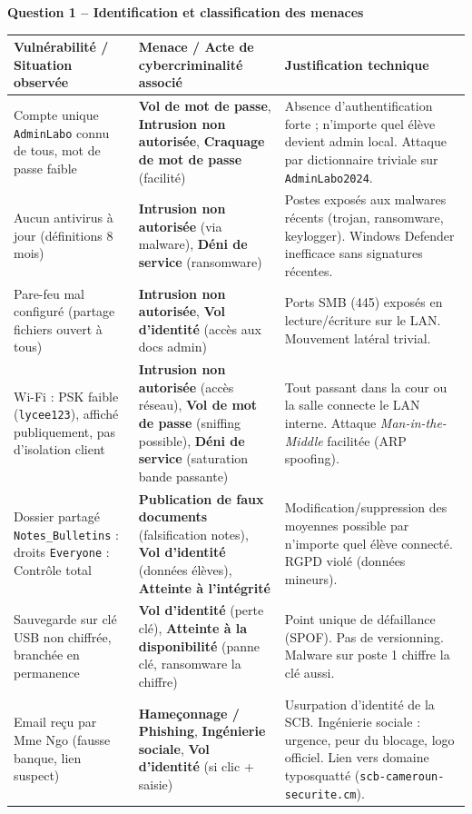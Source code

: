 \documentclass[11pt]{article}
\newcounter{popsec}
\newcounter{popsub}
\newcommand{\courssub}[1]{%
  \stepcounter{popsub}%
  \par\vspace{9pt}\noindent{\popxbold\fontsize{11.5}{13}\selectfont\color{popink}{\color{poporange}\thepopsec.\thepopsub}\hspace{6pt}#1}\par\nopagebreak\vspace{4pt}
}
\begin{document}
\courssub{Démarche et corrigé commenté}
\begin{exoresolu}
\textbf{Question 1 -- Identification et classification des menaces}

\begin{center}
\begin{tabularx}{\linewidth}{|l|X|X|}
\hline
\rowcolor{popblueL}
\textbf{Vulnérabilité / Situation observée} & \textbf{Menace / Acte de cybercriminalité associé} & \textbf{Justification technique} \\
\hline
Compte unique \texttt{AdminLabo} connu de tous, mot de passe faible & \textbf{Vol de mot de passe}, \textbf{Intrusion non autorisée}, \textbf{Craquage de mot de passe} (facilité) & Absence d'authentification forte ; n'importe quel élève devient admin local. Attaque par dictionnaire triviale sur \texttt{AdminLabo2024}. \\
\hline
Aucun antivirus à jour (définitions 8 mois) & \textbf{Intrusion non autorisée} (via malware), \textbf{Déni de service} (ransomware) & Postes exposés aux malwares récents (trojan, ransomware, keylogger). Windows Defender inefficace sans signatures récentes. \\
\hline
Pare-feu mal configuré (partage fichiers ouvert à tous) & \textbf{Intrusion non autorisée}, \textbf{Vol d'identité} (accès aux docs admin) & Ports SMB (445) exposés en lecture/écriture sur le LAN. Mouvement latéral trivial. \\
\hline
Wi-Fi : PSK faible (\texttt{lycee123}), affiché publiquement, pas d'isolation client & \textbf{Intrusion non autorisée} (accès réseau), \textbf{Vol de mot de passe} (sniffing possible), \textbf{Déni de service} (saturation bande passante) & Tout passant dans la cour ou la salle connecte le LAN interne. Attaque \emph{Man-in-the-Middle} facilitée (ARP spoofing). \\
\hline
Dossier partagé \texttt{Notes\_Bulletins} : droits \texttt{Everyone} : Contrôle total & \textbf{Publication de faux documents} (falsification notes), \textbf{Vol d'identité} (données élèves), \textbf{Atteinte à l'intégrité} & Modification/suppression des moyennes possible par n'importe quel élève connecté. RGPD violé (données mineurs). \\
\hline
Sauvegarde sur clé USB non chiffrée, branchée en permanence & \textbf{Vol d'identité} (perte clé), \textbf{Atteinte à la disponibilité} (panne clé, ransomware la chiffre) & Point unique de défaillance (SPOF). Pas de versionning. Malware sur poste 1 chiffre la clé aussi. \\
\hline
Email reçu par Mme Ngo (fausse banque, lien suspect) & \textbf{Hameçonnage / Phishing}, \textbf{Ingénierie sociale}, \textbf{Vol d'identité} (si clic + saisie) & Usurpation d'identité de la SCB. Ingénierie sociale : urgence, peur du blocage, logo officiel. Lien vers domaine typosquatté (\texttt{scb-cameroun-securite.cm}). \\
\hline
\end{tabularx}
\end{center}


\end{exoresolu}
\end{document}
